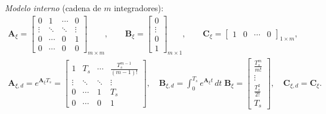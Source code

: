 \textit{Modelo interno} (cadena de $m$ integradores):
\begin{equation}
\begin{gathered}
\mathbf{A}_{\xi} =
\begin{bmatrix} 0 & 1 & \cdots & 0 \\ \vdots & \ddots & \ddots & \vdots \\ 0 & \cdots & 0 & 1 \\ 0 & \cdots & 0 & 0 \end{bmatrix}_{m \times m},
\qquad
\mathbf{B}_{\xi} = \begin{bmatrix} 0 \\ \vdots \\ 0 \\ 1 \end{bmatrix}_{m \times 1},
\qquad
\mathbf{C}_{\xi} = \begin{bmatrix} 1 & 0 & \cdots & 0 \end{bmatrix}_{1 \times m},
\\[8pt]
\mathbf{A}_{\xi,d} = e^{\mathbf{A}_{\xi} T_s} =
\begin{bmatrix} 1 & T_s & \cdots & \frac{T_s^{m-1}}{(m-1)!} \\ \vdots & \ddots & \ddots & \vdots \\ 0 & \cdots & 1 & T_s \\ 0 & \cdots & 0 & 1 \end{bmatrix},
\quad
\mathbf{B}_{\xi,d} = \int_0^{T_s} e^{\mathbf{A}_{\xi} t}\,dt\;\mathbf{B}_{\xi} =
\begin{bmatrix} \frac{T_s^{m}}{m!} \\ \vdots \\ \frac{T_s^{2}}{2!} \\ T_s \end{bmatrix},
\quad
\mathbf{C}_{\xi,d} = \mathbf{C}_{\xi} .
\end{gathered}
\label{eq:disc_modelo}
\end{equation}

